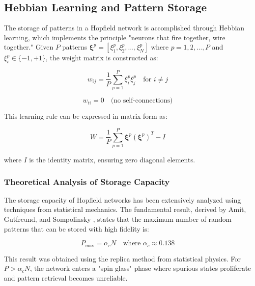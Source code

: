 \documentclass[11pt,a4paper]{article}
\begin{document}
\subsection{Hebbian Learning and Pattern Storage}

The storage of patterns in a Hopfield network is accomplished through Hebbian learning, which implements the principle "neurons that fire together, wire together." Given $P$ patterns $\boldsymbol{\xi}^p = [\xi_1^p, \xi_2^p, \ldots, \xi_N^p]$ where $p = 1, 2, \ldots, P$ and $\xi_i^p \in \{-1, +1\}$, the weight matrix is constructed as:

\begin{equation}
w_{ij} = \frac{1}{P} \sum_{p=1}^{P} \xi_i^p \xi_j^p \quad \text{for } i \neq j
\label{eq:hebbian_detailed}
\end{equation}

\begin{equation}
w_{ii} = 0 \quad \text{(no self-connections)}
\label{eq:noself_detailed}
\end{equation}

This learning rule can be expressed in matrix form as:

\begin{equation}
W = \frac{1}{P} \sum_{p=1}^{P} \boldsymbol{\xi}^p (\boldsymbol{\xi}^p)^T - I
\label{eq:matrix_hebbian}
\end{equation}

where $I$ is the identity matrix, ensuring zero diagonal elements.

\subsubsection{Theoretical Analysis of Storage Capacity}

The storage capacity of Hopfield networks has been extensively analyzed using techniques from statistical mechanics. The fundamental result, derived by Amit, Gutfreund, and Sompolinsky \cite{amit1985}, states that the maximum number of random patterns that can be stored with high fidelity is:

\begin{equation}
P_{\text{max}} = \alpha_c N \quad \text{where } \alpha_c \approx 0.138
\label{eq:capacity_detailed}
\end{equation}

This result was obtained using the replica method from statistical physics. For $P > \alpha_c N$, the network enters a "spin glass" phase where spurious states proliferate and pattern retrieval becomes unreliable.
\end{document}
